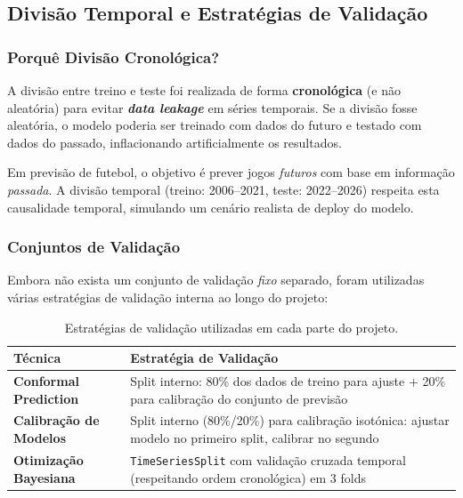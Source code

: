\documentclass[12pt, a4paper]{article}
\begin{document}
\subsection{Divisão Temporal e Estratégias de Validação}

\subsubsection{Porquê Divisão Cronológica?}

A divisão entre treino e teste foi realizada de forma \textbf{cronológica} (e não aleatória) para evitar \textbf{\textit{data leakage}} em séries temporais. Se a divisão fosse aleatória, o modelo poderia ser treinado com dados do futuro e testado com dados do passado, inflacionando artificialmente os resultados.

Em previsão de futebol, o objetivo é prever jogos \textit{futuros} com base em informação \textit{passada}. A divisão temporal (treino: 2006--2021, teste: 2022--2026) respeita esta causalidade temporal, simulando um cenário realista de deploy do modelo.

\subsubsection{Conjuntos de Validação}

Embora não exista um conjunto de validação \textit{fixo} separado, foram utilizadas várias estratégias de validação interna ao longo do projeto:

\begin{table}[H]
  \centering
  \caption{Estratégias de validação utilizadas em cada parte do projeto.}
  \begin{tabular}{lp{8cm}}
    \toprule
    \textbf{Técnica} & \textbf{Estratégia de Validação} \\
    \midrule
    \textbf{Conformal Prediction} & Split interno: 80\% dos dados de treino para ajuste + 20\% para calibração do conjunto de previsão \\[0.3cm]
    \textbf{Calibração de Modelos} & Split interno (80\%/20\%) para calibração isotónica: ajustar modelo no primeiro split, calibrar no segundo \\[0.3cm]
    \textbf{Otimização Bayesiana} & \texttt{TimeSeriesSplit} com validação cruzada temporal (respeitando ordem cronológica) em 3 folds \\
    \bottomrule
  \end{tabular}
  \label{tab:validation}
\end{table}
\end{document}
